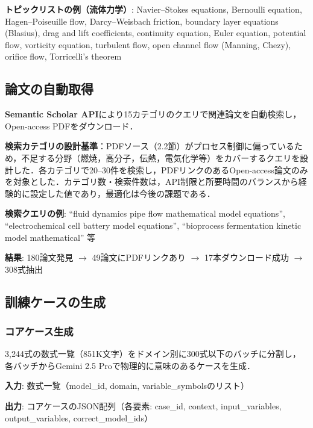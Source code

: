 \documentclass[11pt,a4paper]{ltjsarticle}
\begin{document}
\textbf{トピックリストの例（流体力学）}: Navier--Stokes equations, Bernoulli equation, Hagen--Poiseuille flow, Darcy--Weisbach friction, boundary layer equations (Blasius), drag and lift coefficients, continuity equation, Euler equation, potential flow, vorticity equation, turbulent flow, open channel flow (Manning, Chezy), orifice flow, Torricelli's theorem

\subsection{論文の自動取得}

\textbf{Semantic Scholar API}により15カテゴリのクエリで関連論文を自動検索し，Open-access PDFをダウンロード．

\textbf{検索カテゴリの設計基準}：PDFソース（2.2節）がプロセス制御に偏っているため，不足する分野（燃焼，高分子，伝熱，電気化学等）をカバーするクエリを設計した．各カテゴリで20--30件を検索し，PDFリンクのあるOpen-access論文のみを対象とした．カテゴリ数・検索件数は，API制限と所要時間のバランスから経験的に設定した値であり，最適化は今後の課題である．

\textbf{検索クエリの例}: ``fluid dynamics pipe flow mathematical model equations'', ``electrochemical cell battery model equations'', ``bioprocess fermentation kinetic model mathematical'' 等

\textbf{結果}: 180論文発見 $\to$ 49論文にPDFリンクあり $\to$ 17本ダウンロード成功 $\to$ 308式抽出

\subsection{訓練ケースの生成}

\subsubsection{コアケース生成}

3,244式の数式一覧（851K文字）をドメイン別に300式以下のバッチに分割し，各バッチからGemini 2.5 Proで物理的に意味のあるケースを生成．

\textbf{入力}: 数式一覧（model\_id, domain, variable\_symbolsのリスト）

\textbf{出力}: コアケースのJSON配列（各要素: case\_id, context, input\_variables, output\_variables, correct\_model\_ids）
\end{document}
